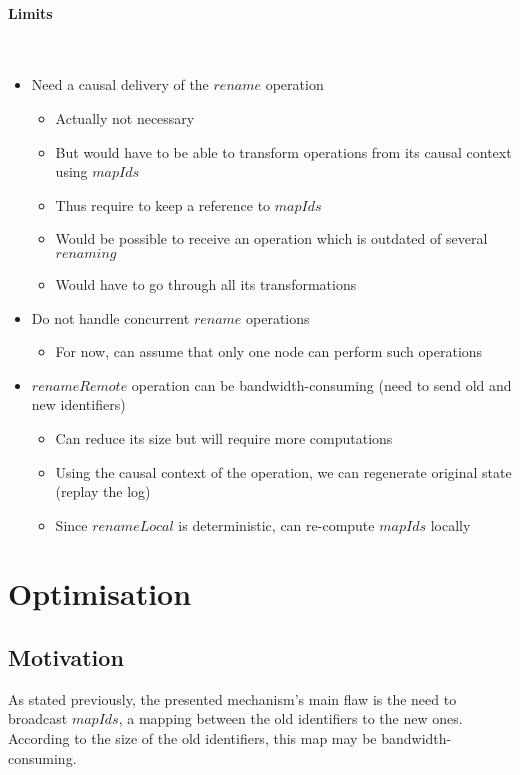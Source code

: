 \documentclass[a4paper]{article}
\begin{document}
\paragraph{Limits}~\\

\begin{itemize}
  \item Need a causal delivery of the $rename$ operation
  \begin{itemize}
    \item Actually not necessary
    \item But would have to be able to transform operations from its causal context using $mapIds$
    \item Thus require to keep a reference to $mapIds$
    \item Would be possible to receive an operation which is outdated of several $renaming$
    \item Would have to go through all its transformations
  \end{itemize}
  \item Do not handle concurrent $rename$ operations
  \begin{itemize}
    \item For now, can assume that only one node can perform such operations
  \end{itemize}
  \item $renameRemote$ operation can be bandwidth-consuming (need to send old and new identifiers)
  \begin{itemize}
    \item Can reduce its size but will require more computations
    \item Using the causal context of the operation, we can regenerate original state (replay the log)
    \item Since $renameLocal$ is deterministic, can re-compute $mapIds$ locally
  \end{itemize}
\end{itemize}

\section{Optimisation}

\subsection{Motivation}

As stated previously, the presented mechanism's main flaw is the need to broadcast
$mapIds$, a mapping between the old identifiers to the new ones.
According to the size of the old identifiers, this map may be bandwidth-consuming.
\end{document}
